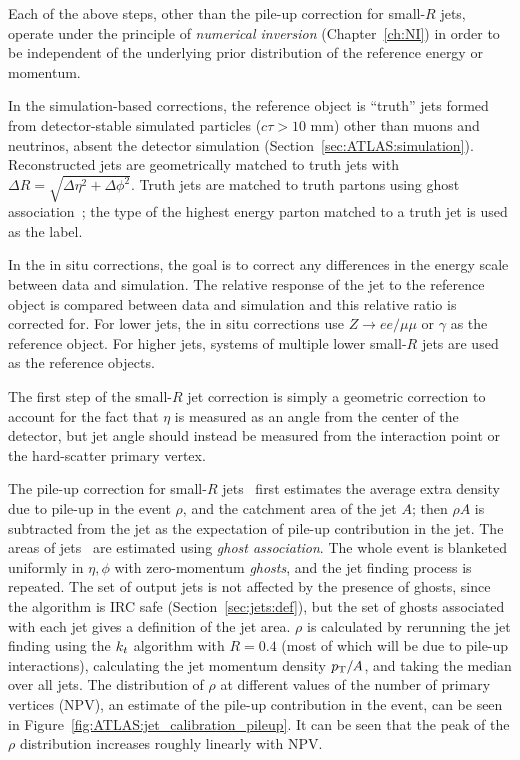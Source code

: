Each of the above steps, other than the pile-up correction for small-$R$ jets, operate under the principle of \textit{numerical inversion} (Chapter~\ref{ch:NI}) in order to be independent of the underlying prior distribution of the reference energy or momentum.

In the simulation-based corrections, the reference object is ``truth'' jets formed from detector-stable simulated particles ($c\tau > 10$ mm) other than muons and neutrinos, absent the detector simulation (Section~\ref{sec:ATLAS:simulation}).
Reconstructed jets are geometrically matched to truth jets with $\Delta R = \sqrt{\Delta\eta^2+\Delta\phi^2}$.
Truth jets are matched to truth partons using ghost association~\cite{Cacciari:2008gn}; the type of the highest energy parton matched to a truth jet is used as the label.

In the in situ corrections, the goal is to correct any differences in the energy scale between data and simulation.
The relative \pt{} response of the jet to the reference object is compared between data and simulation and this relative ratio is corrected for.
For lower \pt{} jets, the in situ corrections use $Z\rightarrow ee/\mu\mu$ or $\gamma$ as the reference object.
For higher \pt{} jets, systems of multiple lower \pt{} small-$R$ jets are used as the reference objects.

The first step of the small-$R$ jet correction is simply a geometric correction to account for the fact that $\eta$ is measured as an angle from the center of the detector, but jet angle should instead be measured from the interaction point or the hard-scatter primary vertex.

The pile-up correction for small-$R$ jets~\cite{Cacciari:2007fd} first estimates the average extra \pt{} density due to pile-up in the event $\rho$, and the catchment area of the jet $A$; then $\rho A$ is subtracted from the jet \pt{} as the expectation of pile-up contribution in the jet.
The areas of jets~\cite{Cacciari:2008gn} are estimated using \textit{ghost association}.
The whole event is blanketed uniformly in $\eta,\phi$ with zero-momentum \textit{ghosts}, and the jet finding process is repeated.
The set of output jets is not affected by the presence of ghosts, since the algorithm is IRC safe (Section~\ref{sec:jets:def}), but the set of ghosts associated with each jet gives a definition of the jet area.
$\rho$ is calculated by rerunning the jet finding using the $k_{t}$ algorithm with $R=0.4$ (most of which will be due to pile-up interactions), calculating the jet momentum density $p_{\text{T}}/A$, and taking the median over all jets.
The distribution of $\rho$ at different values of the number of primary vertices (NPV), an estimate of the pile-up contribution in the event, can be seen in Figure~\ref{fig:ATLAS:jet_calibration_pileup}.
It can be seen that the peak of the $\rho$ distribution increases roughly linearly with NPV.

